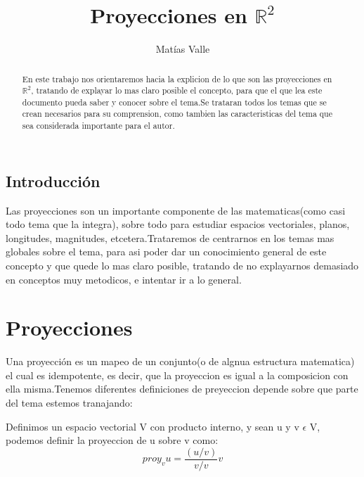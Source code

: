 \documentclass[11pt,spanish,a4paper]{article}
\begin{document}
\newcommand\al{\alpha}
\newcommand\noi{\noindent}
\newcommand\re{\mbox{Re}}
\newcommand\im{\mbox{Im}}
\newcommand\Arg{\mbox{Arg}}


\title{Proyecciones en $\mathbb{R}^2$}
\author{Matías Valle}
\maketitle


\begin{abstract}
En este trabajo nos orientaremos hacia la explicion de lo que son las proyecciones en $\mathbb{R}^2$, tratando de explayar lo mas claro posible el concepto, para que el que lea este documento pueda saber y conocer sobre el tema.Se trataran todos los temas que se crean necesarios para su comprension, como tambien las caracteristicas del tema que sea considerada importante para el autor.
\end{abstract}

\begin{center}
\section{Introducción}
Las proyecciones son un importante componente de las matematicas(como casi todo tema que la integra), sobre todo para estudiar espacios vectoriales, planos, longitudes, magnitudes, etcetera.Trataremos de centrarnos en los temas mas globales sobre el tema, para asi poder dar un conocimiento general de este concepto y que quede lo mas claro posible, tratando de no explayarnos demasiado en conceptos muy metodicos, e intentar ir a lo general.
\end{center}

\section{Proyecciones}
Una proyección es un mapeo de un conjunto(o de algnua estructura matematica) el cual es idempotente, es decir, que la proyeccion es igual a la composicion con ella misma.Tenemos diferentes definiciones de preyeccion depende sobre que parte del tema estemos tranajando:
\itemize


\item Definimos un espacio vectorial V con producto interno, y sean u y v $\epsilon$ V, podemos definir la proyeccion de u sobre v como:
\[proy_v u =\frac{(u/v)}{v/v}v \]
\end{document}
